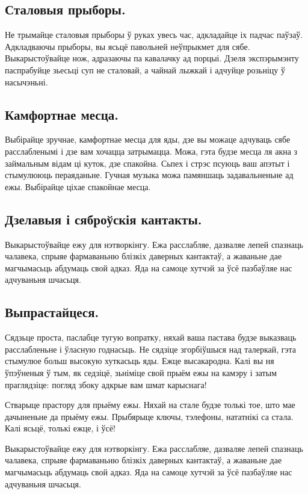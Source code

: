 \subsection{Сталовыя прыборы.}
Не трымайце сталовыя прыборы ў руках увесь час, адкладайце іх падчас паўзаў. Адкладваючы прыборы, вы ясьцё павольней неўпрыкмет для сябе. Выкарыстоўвайце нож, адразаючы па кавалачку ад порцыі. Дзеля экспэрымэнту паспрабуйце зьесьці суп не сталовай, а чайнай лыжкай і адчуйце розьніцу ў насычэньні.

\subsection{Камфортнае месца.}
Выбірайце зручнае, камфортнае месца для яды, дзе вы можаце адчуваць сябе расслабленымі і дзе вам хочацца затрымацца. Можа, гэта будзе месца ля акна з займальным відам ці куток, дзе спакойна. Сьпех і стрэс псуюць ваш апэтыт і стымулююць пераяданьне. Гучная музыка можа памяншаць задавальненьне ад ежы. Выбірайце ціхае спакойнае месца.

\subsection{Дзелавыя і сяброўскія кантакты.}
Выкарыстоўвайце ежу для нэтворкінгу. Ежа расслабляе, дазваляе лепей спазнаць чалавека, спрыяе фармаваньню блізкіх даверных кантактаў, а жаваньне дае магчымасьць абдумаць свой адказ. Яда на самоце хутчэй за ўсё пазбаўляе нас адчуваньня шчасьця.

\subsection{Выпрастайцеся.}
Сядзьце проста, паслабце тугую вопратку, няхай ваша пастава будзе выказваць расслабленьне і ўласную годнасьць. Не сядзіце згорбіўшыся над талеркай, гэта стымулюе больш высокую хуткасьць яды. Ежце высакародна. Калі вы ня ўпэўненыя ў тым, як седзіцё, зьніміце свой прыём ежы на камэру і затым праглядзіце: погляд збоку адкрые вам шмат карыснага!

Стварыце прастору для прыёму ежы. Няхай на стале будзе толькі тое, што мае дачыненьне да прыёму ежы. Прыбярыце ключы, тэлефоны, нататнікі са стала. Калі ясьцё, толькі ежце, і ўсё!

Выкарыстоўвайце ежу для нэтворкінгу. Ежа расслабляе, дазваляе лепей спазнаць чалавека, спрыяе фармаваньню блізкіх даверных кантактаў, а жаваньне дае магчымасьць абдумаць свой адказ. Яда на самоце хутчэй за ўсё пазбаўляе нас адчуваньня шчасьця.

